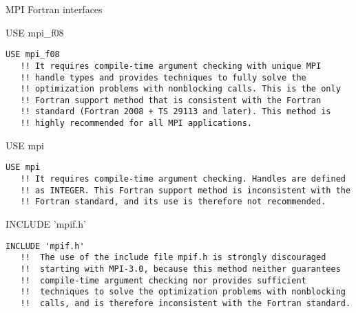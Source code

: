 
\begin{frame}{MPI Fortran interfaces}

 \begin{block}{USE mpi\_f08}
  \begin{lstlisting}[style=myFORTRANcodeS,basicstyle=\ttfamily\footnotesize]
    USE mpi_f08
   !! It requires compile-time argument checking with unique MPI
   !! handle types and provides techniques to fully solve the
   !! optimization problems with nonblocking calls. This is the only
   !! Fortran support method that is consistent with the Fortran
   !! standard (Fortran 2008 + TS 29113 and later). This method is
   !! highly recommended for all MPI applications.
 \end{lstlisting}
\end{block}


 \begin{block}{USE mpi}
  \begin{lstlisting}[style=myFORTRANcodeS,basicstyle=\ttfamily\footnotesize]
    USE mpi 
   !! It requires compile-time argument checking. Handles are defined
   !! as INTEGER. This Fortran support method is inconsistent with the
   !! Fortran standard, and its use is therefore not recommended.
 \end{lstlisting}
\end{block}


 \begin{block}{INCLUDE 'mpif.h'}
  \begin{lstlisting}[style=myFORTRANcodeS,basicstyle=\ttfamily\footnotesize]
    INCLUDE 'mpif.h'
   !!  The use of the include file mpif.h is strongly discouraged
   !!  starting with MPI-3.0, because this method neither guarantees
   !!  compile-time argument checking nor provides sufficient
   !!  techniques to solve the optimization problems with nonblocking
   !!  calls, and is therefore inconsistent with the Fortran standard.
\end{lstlisting}
\end{block}

\end{frame}

